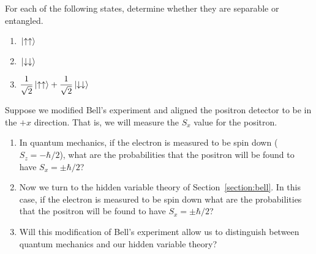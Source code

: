 \begin{problem}
  For each of the following states, determine whether they are
  separable or entangled.
  \begin{enumerate}
  \item $\,|\mbox{$\uparrow\uparrow$}\rangle$
  \item $\,|\mbox{$\downarrow\downarrow$}\rangle$
  \item $\displaystyle\frac{1}{\sqrt{2}}\,|\mbox{$\uparrow\uparrow$}\rangle +
    \frac{1}{\sqrt{2}} \,|\mbox{$\downarrow\downarrow$}\rangle$
  \end{enumerate}
\end{problem}


\begin{problem}
  Suppose we modified Bell's experiment and aligned the positron
  detector to be in the $+x$ direction.  That is, we will measure the
  $S_x$ value for the positron.
  \begin{enumerate}
  \item In quantum mechanics, if the electron is measured to be spin
    down ($S_z=-\hbar/2$), what are the probabilities that the
    positron will be found to have $S_x=\pm\hbar/2$?
  \item Now we turn to the hidden variable theory of
    Section~\ref{section:bell}.  In this case, if the electron is
    measured to be spin down what are the probabilities that the
    positron will be found to have $S_x=\pm\hbar/2$?
  \item Will this modification of Bell's experiment allow us to
    distinguish between quantum mechanics and our hidden variable
    theory?
  \end{enumerate}
\end{problem}


\vfill 

\thispagestyle{empty}

